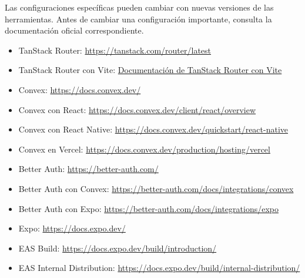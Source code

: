 \documentclass[11pt,a4paper]{article}
\begin{document}
Las configuraciones específicas pueden cambiar con nuevas versiones de las
herramientas. Antes de cambiar una configuración importante, consulta la
documentación oficial correspondiente.

\begin{itemize}

  \item TanStack Router:
    \url{https://tanstack.com/router/latest}

  \item TanStack Router con Vite:
    \href{https://tanstack.com/router/latest/docs/installation/with-vite}{Documentación
    de TanStack Router con Vite}

  \item Convex:
    \url{https://docs.convex.dev/}

  \item Convex con React:
    \url{https://docs.convex.dev/client/react/overview}

  \item Convex con React Native:
    \url{https://docs.convex.dev/quickstart/react-native}

  \item Convex en Vercel:
    \url{https://docs.convex.dev/production/hosting/vercel}

  \item Better Auth:
    \url{https://better-auth.com/}

  \item Better Auth con Convex:
    \url{https://better-auth.com/docs/integrations/convex}

  \item Better Auth con Expo:
    \url{https://better-auth.com/docs/integrations/expo}

  \item Expo:
    \url{https://docs.expo.dev/}

  \item EAS Build:
    \url{https://docs.expo.dev/build/introduction/}

  \item EAS Internal Distribution:
    \url{https://docs.expo.dev/build/internal-distribution/}

\end{itemize}
\end{document}
